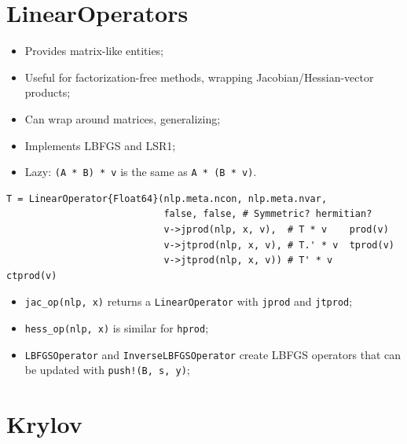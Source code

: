 \section{LinearOperators}

\begin{frame}[fragile,t]
  \begin{itemize}
    \item Provides matrix-like entities;
    \item Useful for factorization-free methods, wrapping Jacobian/Hessian-vector
      products;
    \item Can wrap around matrices, generalizing;
    \item Implements LBFGS and LSR1;
    \item Lazy: \verb+(A * B) * v+ is the same as \verb+A * (B * v)+.
  \end{itemize}
\begin{lstlisting}
T = LinearOperator{Float64}(nlp.meta.ncon, nlp.meta.nvar,
                            false, false, # Symmetric? hermitian?
                            v->jprod(nlp, x, v),  # T * v    prod(v)
                            v->jtprod(nlp, x, v), # T.' * v  tprod(v)
                            v->jtprod(nlp, x, v)) # T' * v    ctprod(v)
\end{lstlisting}
\end{frame}

\begin{frame}[fragile,t]
  \begin{itemize}
    \item \verb+jac_op(nlp, x)+ returns a \verb+LinearOperator+ with \verb+jprod+ and
      \verb+jtprod+;
    \item \verb+hess_op(nlp, x)+ is similar for \verb+hprod+;
    \item \verb+LBFGSOperator+ and \verb+InverseLBFGSOperator+ create LBFGS operators
      that can be updated with \verb+push!(B, s, y)+;
  \end{itemize}
\end{frame}

\section{Krylov}

